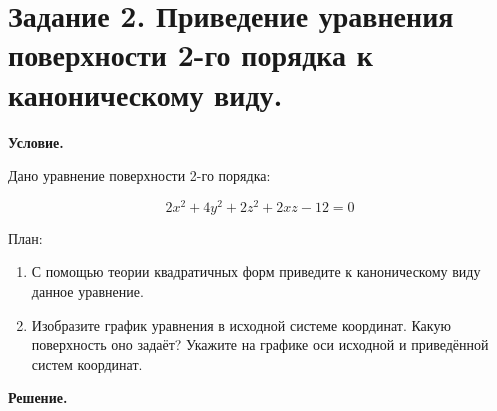 \section{Задание 2. Приведение уравнения поверхности 2-го порядка к каноническому виду.}
\textbf{Условие.}

Дано уравнение поверхности 2-го порядка:

\[2x^2 + 4y^2 + 2z^2 + 2xz -12 = 0\]

План:
\begin{enumerate}
    \item С помощью теории квадратичных форм приведите к каноническому виду данное уравнение.
    \item Изобразите график уравнения в исходной системе координат.
Какую поверхность оно задаёт? Укажите на графике оси исходной и приведённой систем координат.
\end{enumerate}

\vspace{10mm}
\textbf{Решение.}

